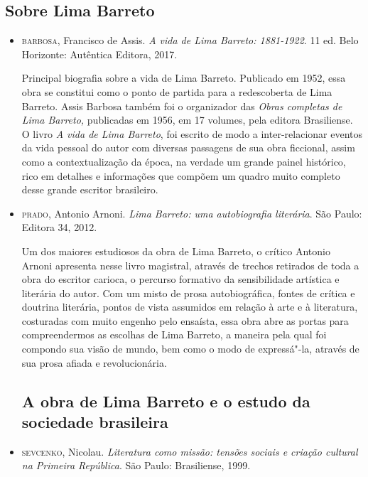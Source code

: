 \documentclass[11pt]{extarticle}
\begin{document}
\subsection{Sobre Lima Barreto}


\begin{itemize}

\item \textsc{barbosa}, Francisco de Assis. \emph{A vida de Lima Barreto: 1881-1922}.
11 ed. Belo Horizonte: Autêntica Editora, 2017. 

Principal biografia
sobre a vida de Lima Barreto. Publicado em 1952, essa obra se constitui
como o ponto de partida para a redescoberta de Lima Barreto. Assis
Barbosa também foi o organizador das \emph{Obras completas de Lima
Barreto,} publicadas em 1956, em 17 volumes, pela editora Brasiliense. O
livro \emph{A vida de Lima Barreto}, foi escrito de modo a
inter-relacionar eventos da vida pessoal do autor com diversas passagens
de sua obra ficcional, assim como a contextualização da época, na
verdade um grande painel histórico, rico em detalhes e informações que
compõem um quadro muito completo desse grande escritor brasileiro.

\item \textsc{prado}, Antonio Arnoni. \emph{Lima Barreto: uma autobiografia literária}.
São Paulo: Editora 34, 2012. 

Um dos maiores estudiosos da obra de Lima
Barreto, o crítico Antonio Arnoni apresenta nesse livro magistral,
através de trechos retirados de toda a obra do escritor carioca, o
percurso formativo da sensibilidade artística e literária do autor. Com
um misto de prosa autobiográfica, fontes de crítica e doutrina
literária, pontos de vista assumidos em relação à arte e à literatura,
costuradas com muito engenho pelo ensaísta, essa obra abre as portas
para compreendermos as escolhas de Lima Barreto, a maneira pela qual foi
compondo sua visão de mundo, bem como o modo de expressá"-la, através de
sua prosa afiada e revolucionária.


\subsection{A obra de Lima Barreto e o estudo da sociedade brasileira}

\item \textsc{sevcenko}, Nicolau. \emph{Literatura como missão: tensões sociais e
criação cultural na Primeira República}. São Paulo: Brasiliense, 1999.


\end{itemize}
\end{document}
